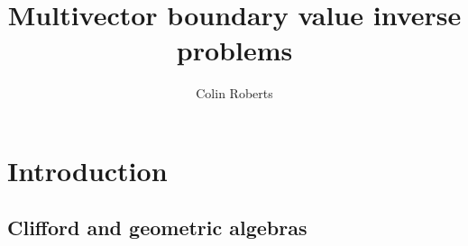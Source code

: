 \documentclass[12pt]{report}
\title{Multivector boundary value inverse problems}
\author{Colin Roberts}
\begin{document}
 \begin{titlingpage}
     \maketitle
     \vfill
 \end{titlingpage}

\tableofcontents



\chapter{Introduction}

%

\section{Clifford and geometric algebras}
\label{subsec:clifford_and_geometric_algebras}

\end{document}
